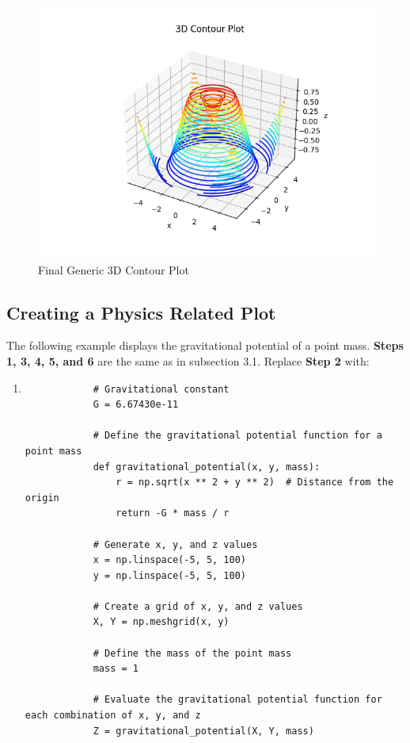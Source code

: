 \documentclass[
11pt, %
a4paper, %
oneside, %
headinclude,footinclude, %
BCOR5mm, %
]{scrartcl}
\begin{document}
	\begin{figure}[H]
		\centering %
		\includegraphics[width=0.4\columnwidth]{Figures/Figure3.png} 
		\caption[Final Generic 3D Contour Plot]{Final Generic 3D Contour Plot} %
		\label{fig:gallery} 
	\end{figure}
	
\subsection{Creating a Physics Related Plot}
	
	The following example displays the gravitational potential of a point mass.
	\newline
	\textbf{Steps 1, 3, 4, 5, and 6} are the same as in subsection 3.1.
	\newline
	Replace \textbf{Step 2} with:
	\begin{enumerate}
		\item[] \begin{verbatim}
			# Gravitational constant
			G = 6.67430e-11
			
			# Define the gravitational potential function for a point mass
			def gravitational_potential(x, y, mass):
			    r = np.sqrt(x ** 2 + y ** 2)  # Distance from the origin
			    return -G * mass / r
			    
			# Generate x, y, and z values
			x = np.linspace(-5, 5, 100)
			y = np.linspace(-5, 5, 100)
			
			# Create a grid of x, y, and z values
			X, Y = np.meshgrid(x, y)
			
			# Define the mass of the point mass
			mass = 1
			
			# Evaluate the gravitational potential function for each combination of x, y, and z
			Z = gravitational_potential(X, Y, mass)
		\end{verbatim}
	\end{enumerate}
	
\end{document}
